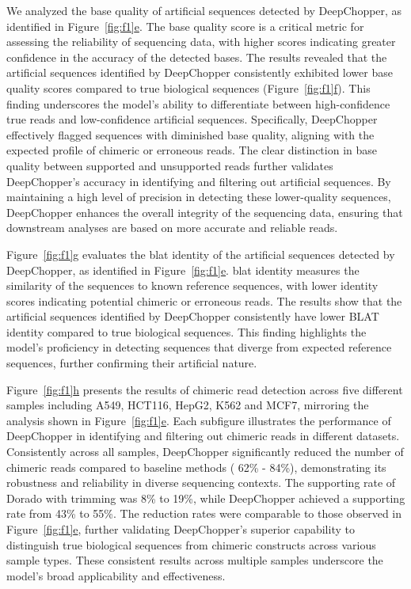 \documentclass[pdflatex, sn-mathphys-num, lineno]{sn-jnl}%
\newcommand{\chopper}{DeepChopper\xspace}
\newcommand{\figref}[2]{Figure~\hyperref[#1]{\ref*{#1}#2}}
\theoremstyle{thmstyleone}%
\theoremstyle{thmstyletwo}%
\theoremstyle{thmstylethree}%
\begin{document}
We analyzed the base quality of artificial sequences detected by \chopper, as identified in \figref{fig:f1}{e}.
The base quality score is a critical metric for assessing the reliability of sequencing data, with higher scores indicating greater confidence in the accuracy of the detected bases.
The results revealed that the artificial sequences identified by \chopper consistently exhibited lower base quality scores compared to true biological sequences (\figref{fig:f1}{f}).
This finding underscores the model's ability to differentiate between high-confidence true reads and low-confidence artificial sequences.
Specifically, \chopper effectively flagged sequences with diminished base quality, aligning with the expected profile of chimeric or erroneous reads.
The clear distinction in base quality between supported and unsupported reads further validates \chopper's accuracy in identifying and filtering out artificial sequences.
By maintaining a high level of precision in detecting these lower-quality sequences, \chopper enhances the overall integrity of the sequencing data, ensuring that downstream analyses are based on more accurate and reliable reads.


\figref{fig:f1}{g} evaluates the \gls{blat} identity of the artificial sequences detected by \chopper, as identified in \figref{fig:f1}{e}.
\gls{blat} identity measures the similarity of the sequences to known reference sequences, with lower identity scores indicating potential chimeric or erroneous reads.
The results show that the artificial sequences identified by \chopper consistently have lower BLAT identity compared to true biological sequences.
This finding highlights the model's proficiency in detecting sequences that diverge from expected reference sequences, further confirming their artificial nature.

\figref{fig:f1}{h} presents the results of chimeric read detection across five different samples including A549, HCT116, HepG2, K562 and MCF7, mirroring the analysis shown in \figref{fig:f1}{e}.
Each subfigure  illustrates the performance of \chopper in identifying and filtering out chimeric reads in different datasets.
Consistently across all samples, \chopper significantly reduced the number of chimeric reads compared to baseline methods ( 62\% - 84\%), demonstrating its robustness and reliability in diverse sequencing contexts.
The supporting rate of Dorado with trimming was 8\% to 19\%, while \chopper achieved a supporting rate from 43\% to 55\%.
The reduction rates were comparable to those observed in \figref{fig:f1}{e}, further validating DeepChopper’s superior capability to distinguish true biological sequences from chimeric constructs across various sample types.
These consistent results across multiple samples underscore the model's broad applicability and effectiveness.
\end{document}
